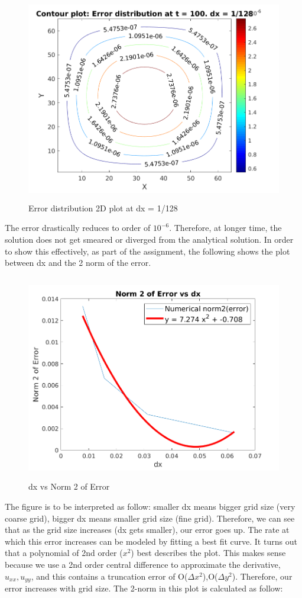 \documentclass[12pt]{article}
\begin{document}
 	 \begin{figure}[H]
 	 	\hfill\includegraphics[width=150mm,height= 90mm]{contour100_error.png}\hspace*{\fill}
 	 	\caption{Error distribution 2D plot at dx = 1/128}
 	 \end{figure}
 	 \noindent
 	 The error drastically reduces to order of $10^{-6}$. Therefore, at longer time, the solution does not get smeared or diverged from the analytical solution. In order to show this effectively, as part of the assignment, the following shows the plot between dx and the 2 norm of the error. 
 	 
 	  \begin{figure}[H]
 	 	\hfill\includegraphics[width=150mm,height= 90mm]{convergence.png}\hspace*{\fill}
 	 	\caption{dx vs Norm 2 of Error}
 	 \end{figure}
 	 \noindent
 	 The figure is to be interpreted as follow: smaller dx means bigger grid size (very coarse grid), bigger dx means smaller grid size (fine grid). Therefore, we can see that as the grid size increases (dx gets smaller), our error goes up. The rate at which this error increases can be modeled by fitting a best fit curve. It turns out that a polynomial of 2nd order ($x^2$) best describes the plot. This makes sense because we use a 2nd order central difference to approximate the derivative, $u_{xx}, u_{yy}$, and this contains a truncation error of O($\Delta x^2$),O($\Delta y^2$). Therefore, our error increases with grid size. The 2-norm in this plot is calculated as follow: 
 	 
\end{document}
